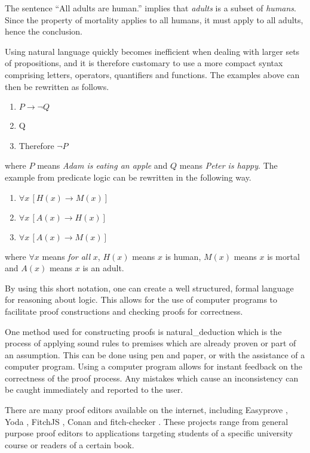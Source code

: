 The sentence ``All adults are human.'' implies that \emph{adults} is a subset of \emph{humans}. Since the property of mortality applies to all humans, it must apply to all adults, hence the conclusion.

Using natural language quickly becomes inefficient when dealing with larger sets of propositions, and it is therefore customary to use a more compact syntax comprising letters, operators, quantifiers and functions. The examples above can then be rewritten as follows.

\begin{enumerate}
      \item $P \rightarrow \lnot Q$
      \item Q
      \item Therefore $\lnot P$
\end{enumerate}

where $P$ means \emph{Adam is eating an apple} and $Q$ means \emph{Peter is happy}. The example from predicate logic can be rewritten in the following way.

\begin{enumerate}[resume]
      \item $\forall x \, [H(x) \rightarrow M(x)]$
      \item $\forall x \, [A(x) \rightarrow H(x)]$
      \item $\forall x \, [A(x) \rightarrow M(x)]$
\end{enumerate}

where $\forall x$ means \emph{for all} $x$, $H(x)$ means $x$ is human, $M(x)$ means $x$ is mortal and $A(x)$ means $x$ is an adult.

By using this short notation, one can create a well structured, formal language for reasoning about logic. This allows for the use of computer programs to facilitate proof constructions and checking proofs for correctness.

One method used for constructing proofs is \gls{natural_deduction} which is the process of applying sound rules to premises which are already proven or part of an assumption. \cite{huth_ryan_2018} This can be done using pen and paper, or with the assistance of a computer program. Using a computer program allows for instant feedback on the correctness of the proof process. Any mistakes which cause an inconsistency can be caught immediately and reported to the user.

There are many proof editors available on the internet, including Easyprove \cite{easyprove}, Yoda \cite{Yoda}, FitchJS \cite{rieppel}, Conan \cite{conan} and fitch-checker \cite{klement}. These projects range from general purpose proof editors to applications targeting students of a specific university course or readers of a certain book.